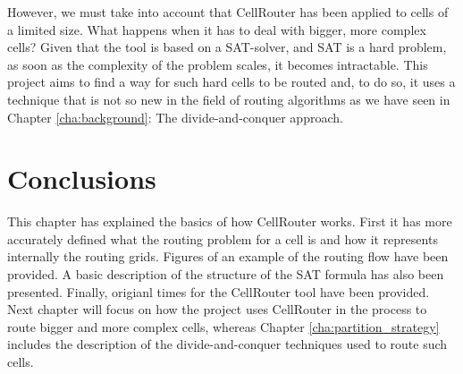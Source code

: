 However, we must take into account that CellRouter has been applied to cells of a limited size. What happens when it has to deal with bigger, more complex cells? Given that the tool is based on a SAT-solver, and SAT is a hard problem, as soon as the complexity of the problem scales, it becomes intractable. This project aims to find a way for such hard cells to be routed and, to do so, it uses a technique that is not so new in the field of routing algorithms as we have seen in Chapter \ref{cha:background}: The divide-and-conquer approach.


\section{Conclusions}

This chapter has explained the basics of how CellRouter works. First it has more accurately defined what the routing problem for a cell is and how it represents internally the routing grids. Figures of an example of the routing flow have been provided. A basic description of the structure of the SAT formula has also been presented. Finally, origianl times for the CellRouter tool have been provided. Next chapter will focus on how the project uses CellRouter in the process to route bigger and more complex cells, whereas Chapter \ref{cha:partition_strategy} includes the description of the divide-and-conquer techniques used to route such cells.